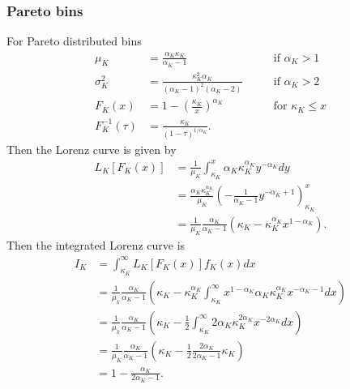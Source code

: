 \documentclass[12pt]{article}
\begin{document}
\subsubsection{Pareto bins}
For Pareto distributed bins
\begin{align*}
  \mu_K & = \frac{\alpha_K\kappa_K}{\alpha_K - 1} &&& \mbox{ if } \alpha_K > 1\\
  \sigma_K^2 &= \frac{\kappa_K^2\alpha_K}{(\alpha_K-1)^2(\alpha_K-2)} &&& \mbox{ if } \alpha_K > 2\\
  F_K(x) &= 1 - \left(\frac{\kappa_K}{x}\right)^{\alpha_K} &&& \mbox{ for } \kappa_K \leq x \\
  F^{-1}_K(\tau) & = \frac{\kappa_K}{(1 - \tau)^{1/\alpha_K}}. &&&
\end{align*}
Then the Lorenz curve is given by
\begin{align*}
  L_K[F_K(x)] & = \frac{1}{\mu_K}\int_{\kappa_K}^{x} \alpha_K\kappa_K^{\alpha_K} y^{-\alpha_K} dy \\
              & = \frac{\alpha_K\kappa_K^{\alpha_K}}{\mu_K}\left(-\frac{1}{\alpha_K - 1}y^{-\alpha_K + 1}\right)_{\kappa_K}^{x} \\
              & = \frac{1}{\mu_K}\frac{\alpha_K}{\alpha_K - 1}\left(\kappa_K - \kappa_K^{\alpha_K}x^{1 - \alpha_K}\right).
\end{align*}
Then the integrated Lorenz curve is
\begin{align*}
  I_K & = \int_{\kappa_K}^{\infty}L_K[F_K(x)]f_K(x) dx\\
      & = \frac{1}{\mu_k}\frac{\alpha_K}{\alpha_K - 1}\left(\kappa_K - \kappa_{K}^{\alpha_K}\int_{\kappa_K}^{\infty}x^{1 - \alpha_K}\alpha_K\kappa_K^{\alpha_K}x^{-\alpha_K - 1} dx\right) \\
        & = \frac{1}{\mu_k}\frac{\alpha_K}{\alpha_K - 1}\left(\kappa_K - \frac{1}{2}\int_{\kappa_K}^{\infty}2\alpha_K\kappa_K^{2\alpha_K}x^{-2\alpha_K} dx\right) \\
      & = \frac{1}{\mu_K}\frac{\alpha_K}{\alpha_K - 1}\left(\kappa_K - \frac{1}{2}\frac{2\alpha_K}{2\alpha_K - 1}\kappa_K\right)\\
      & = 1 - \frac{\alpha_K}{2\alpha_K - 1}.
\end{align*}
\end{document}
